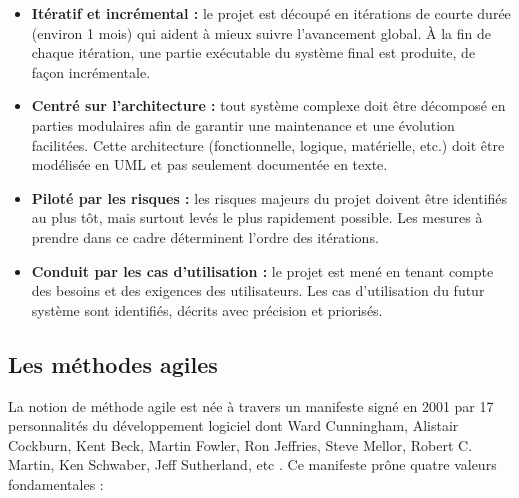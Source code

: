 \begin{itemize}
    \item [\textbullet] \textbf{Itératif et incrémental :} le projet est découpé
        en itérations de courte durée (environ 1 mois) qui aident à mieux suivre
        l’avancement global. À la fin de chaque itération, une partie exécutable
        du système final est produite, de façon incrémentale.
    \item [\textbullet] \textbf{Centré sur l’architecture :} tout système
        complexe doit être décomposé en parties modulaires afin de garantir une
        maintenance et une évolution facilitées. Cette architecture
        (fonctionnelle, logique, matérielle, etc.) doit être modélisée en UML et
        pas seulement documentée en texte.
    \item [\textbullet] \textbf{Piloté par les risques :} les risques majeurs du
        projet doivent être identifiés au plus tôt, mais surtout levés le plus
        rapidement possible. Les mesures à prendre dans ce cadre déterminent
        l’ordre des itérations.
    \item [\textbullet] \textbf{Conduit par les cas d’utilisation :} le projet
        est mené en tenant compte des besoins et des exigences des utilisateurs.
        Les cas d’utilisation du futur système sont identifiés, décrits avec
        précision et priorisés.
        
\end{itemize}
    
\subsection{Les méthodes agiles}
La notion de méthode agile est née à travers un manifeste signé en 2001 par 17
personnalités du développement logiciel dont Ward Cunningham, Alistair
Cockburn, Kent Beck, Martin Fowler, Ron Jeffries, Steve Mellor, Robert C.
Martin, Ken Schwaber, Jeff Sutherland, etc \cite{5}. Ce manifeste prône quatre valeurs
fondamentales \cite{5}: 

